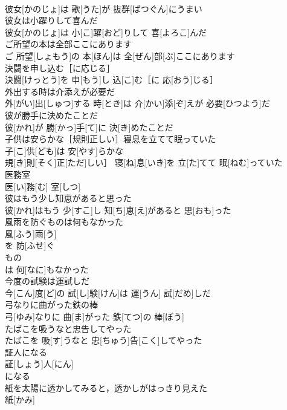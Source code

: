 \documentclass[8pt]{extreport}
\begin{document}
\begin{CJK}{UTF8}{min}
\\	彼女[かのじょ]は 歌[うた]が 抜群[ばつぐん]にうまい
\\	彼女は小躍りして喜んだ	
\\	彼女[かのじょ]は 小[こ]躍[おど]りして 喜[よろこ]んだ
\\	ご所望の本は全部ここにあります	
\\	ご 所望[しょもう]の 本[ほん]は 全[ぜん]部[ぶ]ここにあります
\\	決闘を申し込む［に応じる］	
\\	決闘[けっとう]を 申[もう]し 込[こ]む［に 応[おう]じる］
\\	外出する時は介添えが必要だ	
\\	外[がい]出[しゅつ]する 時[とき]は 介[かい]添[ぞ]えが 必要[ひつよう]だ
\\	彼が勝手に決めたことだ	
\\	彼[かれ]が 勝[かっ]手[て]に 決[き]めたことだ
\\	子供は安らかな［規則正しい］寝息を立てて眠っていた	
\\	子[こ]供[ども]は 安[やす]らかな
\\	規[き]則[そく]正[ただ]しい］ 寝[ね]息[いき]を 立[た]てて 眠[ねむ]っていた
\\	医務室	
\\	医[い]務[む] 室[しつ]
\\	彼はもう少し知恵があると思った	
\\	彼[かれ]はもう 少[すこ]し 知[ち]恵[え]があると 思[おも]った
\\	風雨を防ぐものは何もなかった	
\\	風[ふう]雨[う]
\\	を 防[ふせ]ぐ 
\\	もの 
\\	は 何[なに]もなかった
\\	今度の試験は運試しだ	
\\	今[こん]度[ど]の 試[し]験[けん]は 運[うん] 試[だめ]しだ
\\	弓なりに曲がった鉄の棒	
\\	弓[ゆみ]なりに 曲[ま]がった 鉄[てつ]の 棒[ぼう]
\\	たばこを吸うなと忠告してやった	
\\	たばこを 吸[す]うなと 忠[ちゅう]告[こく]してやった
\\	証人になる	
\\	証[しょう]人[にん]
\\	になる 
\\	紙を太陽に透かしてみると，透かしがはっきり見えた	
\\	紙[かみ]

\end{CJK}
\end{document}
